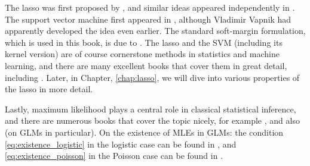 The lasso was first proposed by \cite{tibshirani1996regression}, and similar ideas
appeared independently in \cite{chen1998atomic}. The support vector machine
first appeared in \cite{boser1992training}, although Vladimir Vapnik had
apparently developed the idea even earlier. The standard soft-margin
formulation, which is used in this book, is due to \cite{cortes1995support}. The
lasso and the SVM (including its kernel version) are of course cornerstone
methods in statistics and machine learning, and there are many excellent books
that cover them in great detail, including \cite{hastie2009elements,
  scholkopf2002learning, hastie2015statistical}. Later, in Chapter,
\ref{chap:lasso}, we will dive into various properties of the lasso in more
detail.

Lastly, maximum likelihood plays a central role in classical statistical
inference, and there are numerous books that cover the topic nicely, for example
\cite{cox1974theoretical, silvey1975statistical, lehmann1998theory,
  wasserman2004all}, and also \cite{mccullaugh1989generalized} (on GLMs in
particular). On the existence of MLEs in GLMs: the condition
\eqref{eq:existence_logistic} in the logistic case can be found in
\cite{albert1984existence}, and \eqref{eq:existence_poisson} in the Poisson
case can be found in \cite{haberman1973log}. 

\clearpage

